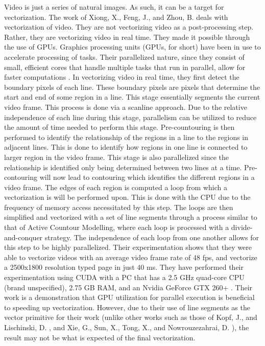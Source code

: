 Video is just a series of natural images. As such, it can be a target for vectorization. The work of Xiong, X., Feng, J., and Zhou, B. deals with vectorization of video. They are not vectorizing video as a post-processing step. Rather, they are vectorizing video in real time. They made it possible through the use of GPUs. Graphics processing units (GPUs, for short) have been in use to accelerate processing of tasks. Their parallelized nature, since they consist of small, efficient cores that handle multiple tasks that run in parallel, allow for faster computations \cite{gpuacceleratedcomputing}. In vectorizing video in real time, they first detect the boundary pixels of each line. These boundary pixels are pixels that determine the start and end of some region in a line. This stage essentially segments the current video frame. This process is done via a scanline approach. Due to the relative independence of each line during this stage, parallelism can be utilized to reduce the amount of time needed to perform this stage. Pre-countouring is then performed to identify the relationship of the regions in a line to the regions in adjacent lines. This is done to identify how regions in one line is connected to larger region in the video frame. This stage is also parallelized since the relationship is identified only being determined between two lines at a time. Pre-contouring will now lead to contouring which identifies the different regions in a video frame. The edges of each region is computed a loop from which a vectorization is will be performed upon. This is done with the CPU due to the frequency of memory access necessitated by this step. The loops are then simplified and vectorized with a set of line segments through a process similar to that of Active Countour Modelling, where each loop is processed with a divide-and-conquer strategy. The independence of each loop from one another allows for this step to be highly parallelized. Their experimentation shows that they were able to vectorize videos with an average video frame rate of 48 fps, and vectorize a 2500x1800 resolution typed page in just 40 ms. They have performed their experimentation using CUDA with a PC that has a 2.5 GHz quad-core CPU (brand unspecified), 2.75 GB RAM, and an Nvidia GeForce GTX 260+ \cite{realtimevectorizationgpu}. Their work is a demonstration that GPU utilization for parallel execution is beneficial to speeding up vectorization. However, due to their use of line segments as the vector primitive for their work (unlike other works such as those of Kopf, J., and Lischinski, D. \cite{depixelizingpixelart}, and Xie, G., Sun, X., Tong, X., and Nowrouzezahrai, D. \cite{hierarchicaldiffusioncurves}), the result may not be what is expected of the final vectorization.

